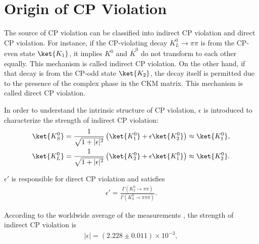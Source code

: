 
%
%


\section{Origin of CP Violation}
The source of CP violation can be classified into indirect CP violation and direct CP violation. For instance, if the CP-violating decay ${K_L^0\to\pi\pi}$ is from the CP-even state $\ket{K_1}$, it implies $K^0$ and $\overline{K}^0$ do not transform to each other equally. This mechanism is called indirect CP violation. On the other hand, if that decay is from the CP-odd state $\ket{K_2}$, the decay itself is permitted due to the presence of the complex phase in the CKM matrix. This mechanism is called direct CP violation.

In order to understand the intrinsic structure of CP violation, $\epsilon$ is  introduced to characterize the strength of indirect CP violation:
%
\vspace{1em}
\begin{align}
\ket{K_S^0} &= \frac{1}{\sqrt{1+|\epsilon|^2}} \left( \ket{K_1^0} + \epsilon \ket{K_2^0} \right) \approx \ket{K_1^0}, \\
\ket{K_L^0} &= \frac{1}{\sqrt{1+|\epsilon|^2}} \left( \ket{K_2^0} + \epsilon \ket{K_1^0} \right) \approx \ket{K_2^0}.
\end{align}

\noindent
$\epsilon'$ is responsible for direct CP violation and satisfies
%
\vspace{1em}
\begin{align}
\epsilon' = \frac{\Gamma(K_2^0 \to \pi \pi)}{\Gamma(K_2^0 \to \pi\pi\pi)}.
\end{align}

\noindent
According to the worldwide average of the measurements \parencite{PDG20}, the strength of indirect CP violation is  
%
\begin{align}
|\epsilon| = (2.228 \pm 0.011) \times 10^{-3}, 
\end{align}

